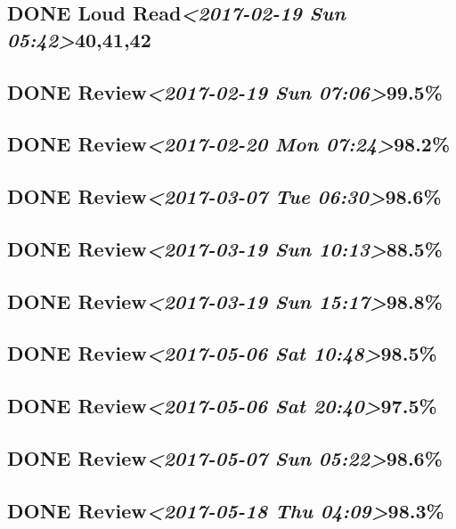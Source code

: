\documentclass[11pt]{ctexart}
\begin{document}
\subsection{{\bfseries\sffamily DONE} Loud Read\textit{<2017-02-19 Sun 05:42>}40,41,42}
\label{sec:orgacdfbf6}
\subsection{{\bfseries\sffamily DONE} Review\textit{<2017-02-19 Sun 07:06>}99.5\%}
\label{sec:org6889b9a}
\subsection{{\bfseries\sffamily DONE} Review\textit{<2017-02-20 Mon 07:24>}98.2\%}
\label{sec:org6b19471}
\subsection{{\bfseries\sffamily DONE} Review\textit{<2017-03-07 Tue 06:30>}98.6\%}
\label{sec:org9fe3f25}
\subsection{{\bfseries\sffamily DONE} Review\textit{<2017-03-19 Sun 10:13>}88.5\%}
\label{sec:org35749c2}
\subsection{{\bfseries\sffamily DONE} Review\textit{<2017-03-19 Sun 15:17>}98.8\%}
\label{sec:orgc824b50}
\subsection{{\bfseries\sffamily DONE} Review\textit{<2017-05-06 Sat 10:48>}98.5\%}
\label{sec:org9b431e1}
\subsection{{\bfseries\sffamily DONE} Review\textit{<2017-05-06 Sat 20:40>}97.5\%}
\label{sec:org7887b0c}
\subsection{{\bfseries\sffamily DONE} Review\textit{<2017-05-07 Sun 05:22>}98.6\%}
\label{sec:orgd7cc98f}
\subsection{{\bfseries\sffamily DONE} Review\textit{<2017-05-18 Thu 04:09>}98.3\%}
\label{sec:org48f89c2}
\end{document}
